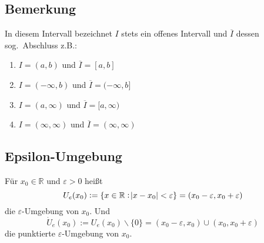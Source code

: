 \documentclass[10pt]{article}
\newcommand{\R}{\mathbb{R}}
\begin{document}
    \subsection{Bemerkung}
    In diesem Intervall bezeichnet $I$ stets ein offenes Intervall und
    $\overline{I}$ dessen sog.\ Abschluss z.B.:
    \begin{enumerate}[label= (\alph*)]
        \item $I = (a, b)$ und $\overline{I} = [a, b]$
        \item $I = (-\infty, b)$ und $\overline{I} = (-\infty, b]$
        \item $I = (a, \infty)$ und $\overline{I} = [a, \infty)$
        \item $I = (\infty, \infty)$ und $\overline{I} = (\infty, \infty)$
    \end{enumerate}

    \subsection{Epsilon-Umgebung}
    Für $x_0 \in \R$ und $\varepsilon > 0$ heißt
    \begin{equation*}
        U_e(x_0) := \{ x \in \R: \abs{x - x_0}<\varepsilon \} =
        (x_0 - \varepsilon, x_0+\varepsilon)
    \end{equation*}
    die $\varepsilon$-Umgebung von $x_0$. Und
    \begin{equation*}
        \dot{U}_e(x_0) := U_e(x_0)\backslash \{0\} =
        (x_0-\varepsilon, x_0) \cup (x_0, x_0+\varepsilon)
    \end{equation*}
    die punktierte $\varepsilon$-Umgebung von $x_0$.
\end{document}
